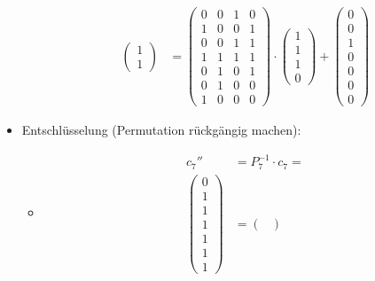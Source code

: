 \begin{itemize}
\begin{itemize}
\begin{align*}
\begin{pmatrix}
            1\\
            1
        \end{pmatrix}
        &=
        \begin{pmatrix} %
            0 & 0 & 1 & 0\\
            1 & 0 & 0 & 1\\
            0 & 0 & 1 & 1\\
            1 & 1 & 1 & 1\\
            0 & 1 & 0 & 1\\
            0 & 1 & 0 & 0\\
            1 & 0 & 0 & 0
        \end{pmatrix}
        \cdot
        \begin{pmatrix} %
            1\\
            1\\
            1\\
            0 
        \end{pmatrix}
        +
        \begin{pmatrix} %
            0\\
            0\\
            1\\
            0\\
            0\\
            0\\
            0
        \end{pmatrix} 
        \end{align*}
    \end{itemize}
    \item Entschlüsselung (Permutation rückgängig machen):
    \begin{itemize}
        \item[]
        \begin{align*}
            c_{7}''&=P_7^{-1}\cdot c_7=\\
            \begin{pmatrix} %
                0\\
                1\\
                1\\
                1\\
                1\\
                1\\
                1
            \end{pmatrix}
            &=
            \begin{pmatrix} %

\end{pmatrix}
\end{align*}
\end{itemize}
\end{itemize}
